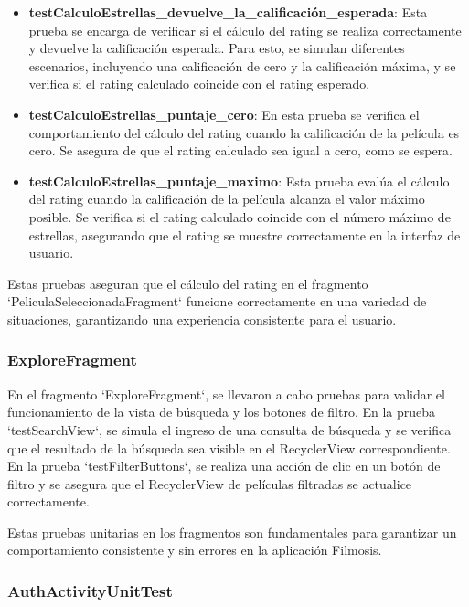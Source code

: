 \documentclass{article}
\begin{document}
\begin{itemize}
    \item \textbf{testCalculoEstrellas\_devuelve\_la\_calificación\_esperada}: Esta prueba se encarga de verificar si el cálculo del rating se realiza correctamente y devuelve la calificación esperada. Para esto, se simulan diferentes escenarios, incluyendo una calificación de cero y la calificación máxima, y se verifica si el rating calculado coincide con el rating esperado.
    
    \item \textbf{testCalculoEstrellas\_puntaje\_cero}: En esta prueba se verifica el comportamiento del cálculo del rating cuando la calificación de la película es cero. Se asegura de que el rating calculado sea igual a cero, como se espera.
    
    \item \textbf{testCalculoEstrellas\_puntaje\_maximo}: Esta prueba evalúa el cálculo del rating cuando la calificación de la película alcanza el valor máximo posible. Se verifica si el rating calculado coincide con el número máximo de estrellas, asegurando que el rating se muestre correctamente en la interfaz de usuario.
\end{itemize}

Estas pruebas aseguran que el cálculo del rating en el fragmento `PeliculaSeleccionadaFragment` funcione correctamente en una variedad de situaciones, garantizando una experiencia consistente para el usuario.

\subsubsection{ExploreFragment}

En el fragmento `ExploreFragment`, se llevaron a cabo pruebas para validar el funcionamiento de la vista de búsqueda y los botones de filtro. En la prueba `testSearchView`, se simula el ingreso de una consulta de búsqueda y se verifica que el resultado de la búsqueda sea visible en el RecyclerView correspondiente. En la prueba `testFilterButtons`, se realiza una acción de clic en un botón de filtro y se asegura que el RecyclerView de películas filtradas se actualice correctamente.

Estas pruebas unitarias en los fragmentos son fundamentales para garantizar un comportamiento consistente y sin errores en la aplicación Filmosis.

\subsubsection{AuthActivityUnitTest}
\end{document}
